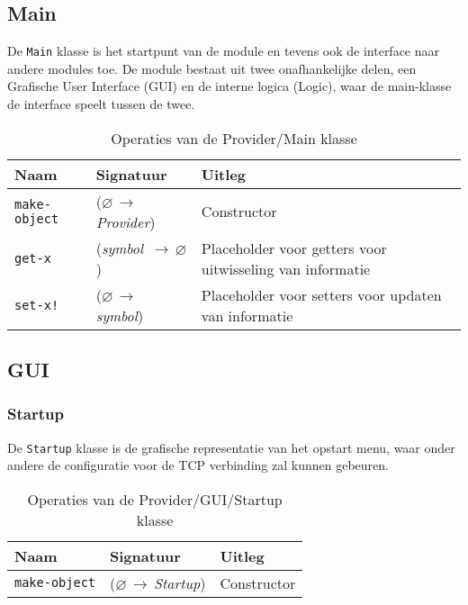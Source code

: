 \documentclass[a4paper, 11pt]{article}
\newcommand{\naar}{\,$\rightarrow$\,}
\renewcommand{\empty}{$\varnothing$}
\newcommand{\<}{\scriptsize\textless\normalsize}
\renewcommand{\>}{\scriptsize\textgreater\normalsize}
\begin{document}
\subsection{Main} %
De \texttt{Main} klasse is het startpunt van de module en tevens ook de interface naar andere modules toe. De module bestaat uit twee onafhankelijke delen, een Grafische User Interface (GUI) en de interne logica (Logic), waar de main-klasse de interface speelt tussen de twee.
\begin{table}[H]
	\begin{center}
		\begin{tabular}{|l l l|}
			\hline
			\textbf{Naam} & \textbf{Signatuur} & \textbf{Uitleg}\\
			\hline
			\texttt{make-object} & (\empty \naar \textit{Provider}) & Constructor\\
			\hline
			\texttt{get-x} & (\textit{symbol} \naar \empty) & Placeholder voor getters voor uitwisseling van informatie\\
			\texttt{set-x!} & (\empty \naar \textit{symbol}) & Placeholder voor setters voor updaten van informatie\\
			\hline
		\end{tabular}
		\caption{Operaties van de Provider/Main klasse}
	\end{center}
\end{table}

\subsection{GUI} %

\subsubsection{Startup} %
De \texttt{Startup} klasse is de grafische representatie van het opstart menu, waar onder andere de configuratie voor de TCP verbinding zal kunnen gebeuren.
\begin{table}[H]
	\begin{center}
		\begin{tabular}{|l l l|}
			\hline
			\textbf{Naam} & \textbf{Signatuur} & \textbf{Uitleg}\\
			\hline
			\texttt{make-object} & (\empty \naar \textit{Startup}) & Constructor\\
			\hline
		\end{tabular}
		\caption{Operaties van de Provider/GUI/Startup klasse}
	\end{center}
\end{table}
\end{document}
